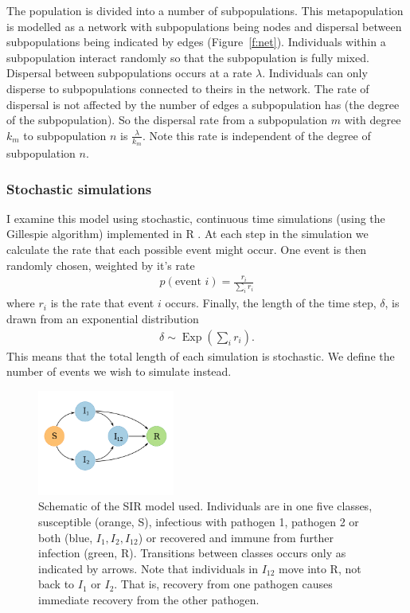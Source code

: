 The population is divided into a number of subpopulations.
This metapopulation is modelled as a network with subpopulations being nodes and dispersal between subpopulations being indicated by edges (Figure~\ref{f:net}).
Individuals within a subpopulation interact randomly so that the subpopulation is fully mixed.
Dispersal between subpopulations occurs at a rate $\lambda$.
Individuals can only disperse to subpopulations connected to theirs in the network.
The rate of dispersal is not affected by the number of edges a subpopulation has (the degree of the subpopulation).
So the dispersal rate from a subpopulation $m$ with degree $k_m$ to subpopulation $n$ is $\frac{\lambda}{k_m}$.
Note this rate is independent of the degree of subpopulation $n$.





\subsubsection{Stochastic simulations}

I examine this model using stochastic, continuous time simulations (using the Gillespie algorithm) implemented in R \cite{R}.
At each step in the simulation we calculate the rate that each possible event might occur.
One event is then randomly chosen, weighted by it's rate
\begin{align}
  p(\text{event } i) = \frac{r_i}{\sum_i r_i}
\end{align}
where $r_i$ is the rate that event $i$ occurs.
Finally, the length of the time step, $\delta$, is drawn from an exponential distribution 
\begin{align}
  \delta \sim \operatorname{Exp}\left(\sum_i r_i  \right).
\end{align}
This means that the total length of each simulation is stochastic. 
We define the number of events we wish to simulate instead.


\begin{figure}[t]
\centering
  \includegraphics[width=0.4\textwidth]{imgs/SIRoption1.pdf}
  \caption[Schematic of the SIR model used]{
Schematic of the SIR model used. 
Individuals are in one five classes, susceptible (orange, S), infectious with pathogen 1, pathogen 2 or both (blue, $I_1, I_2, I_{12}$) or recovered and immune from further infection (green, R).
Transitions between classes occurs only as indicated by arrows.
Note that individuals in $I_{12}$ move into R, not back to $I_1$ or $I_2$. 
That is, recovery from one pathogen causes immediate recovery from the other pathogen.
}
  \label{f:sir}
\end{figure}



